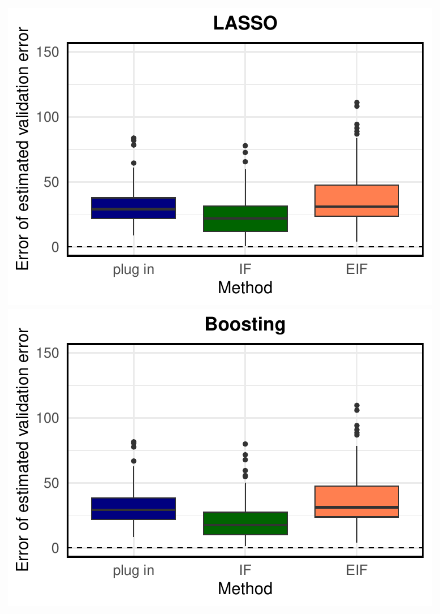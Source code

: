 \begin{figure}[ht]
          \centering
        \begin{minipage}{0.3\textwidth}
                \centering
                \includegraphics[clip, trim = 0cm 0cm 0cm 0cm, width = \textwidth]{plot/ACIC_linear_propensity_linear_HTE_estimator_error_LASSO.pdf}
        \end{minipage}
        \begin{minipage}{0.3\textwidth}
                \centering
                \includegraphics[clip, trim = 0cm 0cm 0cm 0cm, width = \textwidth]{plot/ACIC_linear_propensity_linear_HTE_estimator_error_Boosting.pdf}
        \end{minipage}
        \begin{minipage}{0.3\textwidth}
                \centering

\end{minipage}
\end{figure}

